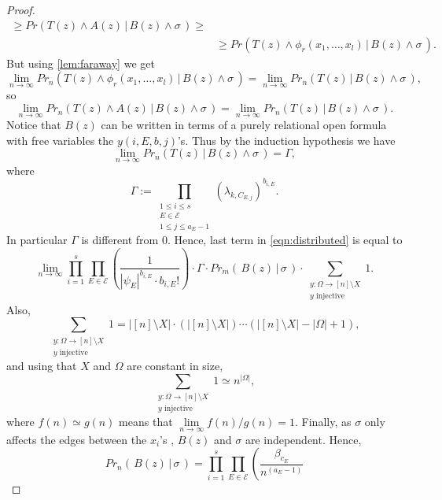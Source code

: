 \documentclass[11pt,notitlepage]{report}
\theoremstyle{definition}
\newcommand{\Ln}{\lim\limits_{n\to \infty}}
\begin{document}
\begin{proof}
\begin{align*}
	\geq Pr( T(z) \wedge A(z)  \, | \, B(z) \wedge \sigma \, ) \geq \\ 
	& \geq Pr(T(z) \wedge \phi_r(x_1,\dots,x_l) 
	\, | \, B(z) \wedge \sigma \, ).
	\end{align*}
	But using \cref{lem:faraway} we get
	\[ \Ln  Pr_n(T(z) \wedge \phi_r(x_1,\dots,x_l)
	\, | \, B(z) \wedge \sigma \, ) = 
	\Ln Pr_n(T(z)\, | \, B(z) \wedge \sigma \, ), \]
	so
	\begin{equation} 
	\Ln  Pr_n(T(z) \wedge A(z)
	\, | \, B(z) \wedge \sigma \, ) = 
	\Ln Pr_n(T(z)\, | \, B(z) \wedge \sigma \, ). 
	\end{equation}
 	Notice that $B(z)$ can be written in terms of a purely relational
 	open formula with free variables the $y(i,E,b,j)$'s.
 	Thus by the induction hypothesis we have
 	\[\Ln Pr_n( T(z)  \, | \, B(z) \wedge \sigma \, )= \Gamma, \]
 	where 
 	\begin{equation}\label{eqn:gammadef}
 	\Gamma:=\prod_{\substack{1\leq i \leq s \\ E\in \mathcal{E}\\
 	1\leq j \leq a_E - 1 }} (\lambda_{k,C_{E,j}})^{b_{i,E}}.
 	\end{equation}
 	In particular $\Gamma$ is different from $0$.
 	Hence, last term in \cref{eqn:distributed} is equal to
 	\begin{equation} \label{eqn:distributed2}
 	\Ln	\prod_{i=1}^{s}
 		\prod_{E\in \mathcal{E}} \left(\frac{1}{|\psi_E|^{b_{i,E}} \cdot b_{i,E}!}\right) 
 		\cdot \Gamma \cdot
 		Pr_m(\, B(z) \, | \, \sigma \, )
 		\cdot \sum_{\substack{y:\Omega \rightarrow [n]\setminus X\\ y \text{ injective}}} 1.
 	\end{equation} 
 	Also,
 	\[\sum_{\substack{y:\Omega \rightarrow [n]\setminus X\\ y \text{ injective}}} 1 =|[n]\setminus X|\cdot (|[n]\setminus X|)\cdots 
 	(|[n]\setminus X|-|\Omega|+1), \]
 	and using that $X$ and $\Omega$ are constant in size,
 	\begin{equation}\label{eqn:sumones}
 	\sum_{\substack{y:\Omega \rightarrow [n]\setminus X\\ y \text{ injective}}} 1 \simeq n^{|\Omega|},
 	\end{equation}
 	where $f(n)\simeq g(n)$ means that $\Ln f(n)/g(n)=1$.
 	Finally, as $\sigma$ only affects the edges between the $x_i$'s
 	, $B(z)$ and $\sigma$ are independent. Hence,
 	\[ Pr_n(\, B(z) \, | \, \sigma \, ) = \prod_{i=1}^{s} 
 	\prod_{E\in \mathcal{E}} \left(\frac{\beta_{c_E}}{n^{(a_E -1)}}
\]
\end{proof}
\end{document}
